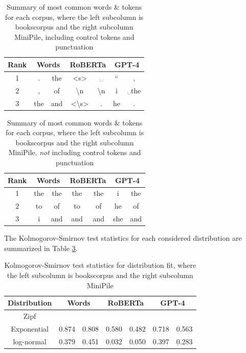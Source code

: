 \documentclass[11pt]{article}
\begin{document}
\begin{table}
    \centering
    \begin{tabular}{|c|c|c|c|c|c|c|}
        \hline
        \textbf{Rank} & \multicolumn{2}{c|}{\textbf{Words}} & \multicolumn{2}{c|}{\textbf{RoBERTa}} & \multicolumn{2}{c|}{\textbf{GPT-4}}  \\
        \hline
        1 & . & the & <s> & ␣ & `` & , \\
        \hline
        2 & , & of & \textbackslash n & \textbackslash n & i & ␣the \\
        \hline
        3 & the & and & <\textbackslash s> & . & he & . \\
        \hline
    \end{tabular}
    \caption{Summary of most common words \& tokens for each corpus, where the left subcolumn is bookscorpus and the right subcolumn MiniPile, including control tokens and punctuation}
    \label{tbl:token ranks}
\end{table}

\begin{table}
    \centering
    \begin{tabular}{|c|c|c|c|c|c|c|}
        \hline
        \textbf{Rank} & \multicolumn{2}{c|}{\textbf{Words}} & \multicolumn{2}{c|}{\textbf{RoBERTa}} & \multicolumn{2}{c|}{\textbf{GPT-4}}  \\
        \hline
        1 & the & the & the & the & i & the \\
        \hline
        2 & to & of & to & of & he & of \\
        \hline
        3 & i & and & and & and & she & and \\
        \hline
    \end{tabular}
    \caption{Summary of most common words \& tokens for each corpus, where the left subcolumn is bookscorpus and the right subcolumn MiniPile, \textit{not} including control tokens and punctuation}
    \label{tbl:token ranks no control}
\end{table}

The Kolmogorov-Smirnov test statistics for each considered distribution are summarized in Table \ref{tbl:kstest}.

\begin{table}
    \centering
    \begin{tabular}{|c|c|c|c|c|c|c|}
        \hline
        \textbf{Distribution} & \multicolumn{2}{c|}{\textbf{Words}} & \multicolumn{2}{c|}{\textbf{RoBERTa}} & \multicolumn{2}{c|}{\textbf{GPT-4}}  \\
        \hline
        Zipf &  &  &  &  &  &  \\
        \hline
        Exponential & 0.874 & 0.808 & 0.580 & 0.482 & 0.718 & 0.563 \\
        \hline
        log-normal & 0.379 & 0.451 & 0.032 & 0.050 & 0.397 & 0.283 \\
        \hline
    \end{tabular}
    \caption{Kolmogorov-Smirnov test statistics for distribution fit, where the left subcolumn is bookscorpus and the right subcolumn MiniPile}
    \label{tbl:kstest}
\end{table}
\end{document}

